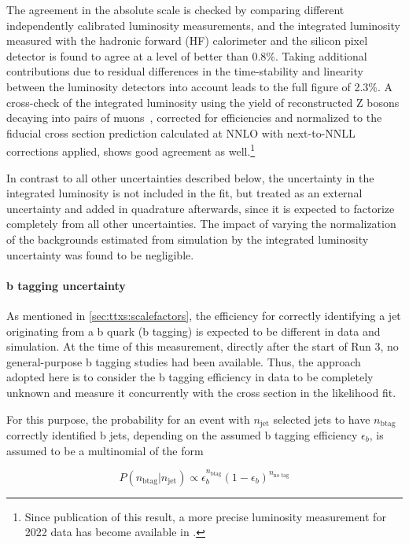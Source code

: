 The agreement in the absolute scale is checked by comparing different independently calibrated luminosity measurements, and the integrated luminosity measured with the hadronic forward (HF) calorimeter and the silicon pixel detector is found to agree at a level of better than 0.8\%.
Taking additional contributions due to residual differences in the time-stability and linearity between the luminosity detectors into account leads to the full figure of 2.3\%.
A cross-check of the integrated luminosity using the yield of reconstructed Z bosons decaying into pairs of muons~\cite{CMS:DP-2023-003}, corrected for efficiencies and normalized to the fiducial cross section prediction calculated at NNLO with next-to-NNLL corrections applied, shows good agreement as well.\footnote{Since publication of this result, a more precise luminosity measurement for 2022 data has become available in .}

In contrast to all other uncertainties described below, the uncertainty in the integrated luminosity is not included in the fit, but treated as an external uncertainty and added in quadrature afterwards, since it is expected to factorize completely from all other uncertainties.
The impact of varying the normalization of the backgrounds estimated from simulation by the integrated luminosity uncertainty was found to be negligible.

\paragraph{b tagging uncertainty}

As mentioned in \cref{sec:ttxs:scalefactors}, the efficiency for correctly identifying a jet originating from a b quark (b tagging) is expected to be different in data and simulation. At the time of this measurement, directly after the start of Run 3, no general-purpose b tagging studies had been available. Thus, the approach adopted here is to consider the b tagging efficiency in data to be completely unknown and measure it concurrently with the cross section in the likelihood fit.

For this purpose, the probability for an event with $n_{\mathrm{jet}}$ selected jets to have $n_{\mathrm{b tag}}$ correctly identified b jets, depending on the assumed b tagging efficiency $\epsilon_b$, is assumed to be a multinomial of the form

\begin{equation}
\label{eq:ttxs:btags}
    P (n_{\mathrm{b tag}} | n_{\mathrm{jet}}) \propto \epsilon_b^{n_{\mathrm{b tag}}} (1 - \epsilon_b)^{ n_{\text{no tag}}}
\end{equation}

